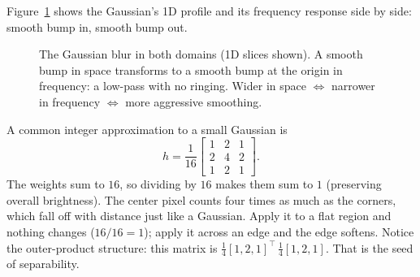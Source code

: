 Figure~\ref{ch31:fig-gauss} shows the Gaussian's 1D profile and its frequency
response side by side: smooth bump in, smooth bump out.

\begin{figure}[H]
\centering
{}
\caption{The Gaussian blur in both domains (1D slices shown). A smooth bump in
space transforms to a smooth bump at the origin in frequency: a low-pass with no
ringing. Wider in space $\Leftrightarrow$ narrower in frequency $\Leftrightarrow$
more aggressive smoothing.}
\label{ch31:fig-gauss}
\end{figure}

\begin{example}
\label{ch31:ex-gauss3}
A common integer approximation to a small Gaussian is
\[
h = \frac{1}{16}\begin{bmatrix} 1 & 2 & 1\\ 2 & 4 & 2\\ 1 & 2 & 1\end{bmatrix}.
\]
The weights sum to $16$, so dividing by $16$ makes them sum to $1$ (preserving
overall brightness). The center pixel counts four times as much as the corners,
which fall off with distance just like a Gaussian. Apply it to a flat region and
nothing changes ($16/16 = 1$); apply it across an edge and the edge softens.
Notice the outer-product structure: this matrix is
$\frac14[1,2,1]^{\!\top}\,\frac14[1,2,1]$. That is the seed of separability.
\end{example}

